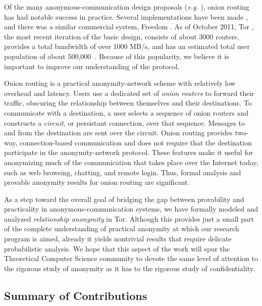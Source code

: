 \documentclass[prodmode,acmtissec]{acmsmall}
\begin{document}
Of the many anonymous-communication design proposals (\emph{e.g.} \cite{chaum-mix,CHAUM,crowds:tissec,buses03,Salsa,Corrigan-Gibbs:2010:DAA:1866307.1866346}), onion routing
\cite{onion-routing:ih96} has had notable success in practice.
Several implementations have been made
\cite{onion-routing:ih96,onion-routing:pet2000,tor-design}, and there
was a similar commercial system, Freedom \cite{freedom1-arch}.  As of
October 2011, Tor \cite{tor-design}, the most recent iteration of the
basic design, consists of about 3000 routers, provides a total
bandwidth of over 1000 MB/s, and has an estimated total user
population of about 500,000~\cite{tor-metrics}.  Because of this
popularity, we believe it is important to improve our understanding of
the protocol.

Onion routing is a practical anonymity-network scheme with relatively low overhead and latency.  Users use a dedicated set of \emph{onion routers} to forward their traffic, obscuring the relationship between themselves and their destinations.  To communicate with a destination, a user selects a sequence of onion routers and constructs a \emph{circuit}, or persistant connection, over that sequence.  Messages to and from the destination are sent over the circuit.  Onion routing provides two-way, connection-based communication and does not require that the destination participate in the anonymity-network protocol.  These features make it useful for anonymizing much of the communication that takes place over the Internet today, such as web browsing, chatting, and remote login.  Thus, formal analysis and provable anonymity results for onion routing are significant.

As a step toward the overall goal of bridging the gap between provability and practicality in anonymous-communication systems, we have formally modeled and analyzed \emph{relationship anonymity} \cite{terminology,ShWa-Relationship} in Tor. Although this provides just a small part of the complete understanding of practical anonymity at which our research program is aimed, already it yields nontrivial results that require delicate probabilistic analysis. We hope that this aspect of the work will spur the Theoretical Computer Science community to devote the same level of attention to the rigorous study of anonymity as it has to the rigorous study of confidentiality. 

\subsection{Summary of Contributions}
\end{document}
